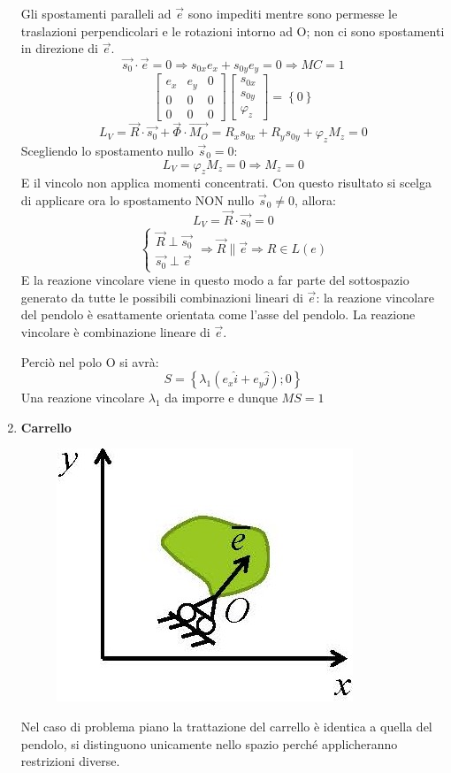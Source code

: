 \documentclass{article}
\begin{document}
\begin{adjustwidth}{2in}{}
\begin{enumerate}
Gli spostamenti paralleli ad $\vec{e}$ sono impediti mentre sono permesse le traslazioni perpendicolari e le rotazioni intorno ad O; non ci sono spostamenti in direzione di $\vec{e}$.
\[ 
\vec{s_{0}} \cdot \vec{e} = 0 \Rightarrow s_{0x}e_{x} + s_{0y}e_{y} = 0 \Rightarrow MC = 1
\]
\[
\left[\begin{array}{ccc}
	e_{x} & e_{y} & 0 \\
	0 & 0 & 0 \\
	0 & 0 & 0
\end{array}\right] \left[ \begin{array}{c}
	s_{0x} \\
	s_{0y} \\
	\varphi_{z}
\end{array}\right] = \left\lbrace 0 \right\rbrace
\]
\[
	L_{V} = \vec{R} \cdot \vec{s_{0}}  + \vec{\Phi} \cdot \vec{M_{O}} = R_{x}s_{0x} + R_{y}s_{0y} + \varphi_{z}M_{z} = 0
\]
Scegliendo lo spostamento nullo $\vec{s}_0 =0$: 
\[
L_{V} =  \varphi_{z}M_{z} = 0 \Rightarrow M_{z} = 0
\]
E il vincolo non applica momenti concentrati.
Con questo risultato si scelga di applicare ora lo spostamento NON nullo $\vec{s}_0 \ne 0$, allora: 
\[
L_{V} = \vec{R} \cdot \vec{s_{0}}  = 0
\] 
\[ 
\begin{cases}
	\vec{R} \perp \vec{s_{0}} \\
	\vec{s_{0}} \perp \vec{e}
	\end{cases} \Rightarrow \vec{R} \parallel \vec{e} \Rightarrow R \in L(e)
\]
E la reazione vincolare viene in questo modo a far parte del sottospazio generato da tutte le possibili combinazioni lineari di $\vec{e}$: la reazione vincolare del pendolo è esattamente orientata come l'asse del pendolo. La reazione vincolare è combinazione lineare di $\vec{e}$.

Perciò nel polo O si avrà:
\[
S = \left\lbrace \lambda_{1} (e_{x}\hat{i} + e_{y}\hat{j});0\right\rbrace 
\]
Una reazione vincolare $\lambda_{1}$ da imporre e dunque $MS = 1$
\newpage
\item \textbf{Carrello}\newline
\begin{figure}[H]
	\centering
	\includegraphics[width=0.25\linewidth]{"immagini/1.PARTE1_Pagina_33"}
\end{figure}
Nel caso di problema piano la trattazione del carrello è identica a quella del pendolo, si distinguono unicamente nello spazio perché applicheranno restrizioni diverse. \newline


\end{enumerate}
\end{adjustwidth}
\end{document}

